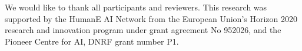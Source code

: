 \begin{acks}
We would like to thank all participants and reviewers. 
This research was supported by the HumanE AI Network from the European Union’s Horizon 2020 research and innovation program under grant agreement No 952026, and the Pioneer Centre for AI, DNRF grant number P1.
\end{acks}
